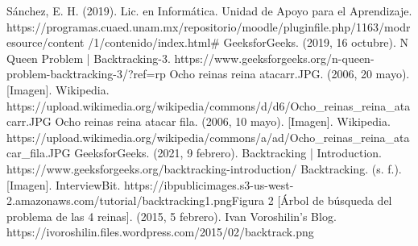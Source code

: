 \documentclass{article}
\begin{document}
\begin{thebibliography}{}
    Sánchez, E. H. (2019). Lic. en Informática. Unidad de Apoyo para el Aprendizaje. https://programas.cuaed.unam.mx/repositorio/moodle/pluginfile.php/1163/modresource/content
    /1/contenido/index.html#
    GeeksforGeeks. (2019, 16 octubre). N Queen Problem | Backtracking-3. https://www.geeksforgeeks.org/n-queen-problem-backtracking-3/?ref=rp
    Ocho reinas reina atacarr.JPG. (2006, 20 mayo). [Imagen]. Wikipedia. https://upload.wikimedia.org/wikipedia/commons/d/d6/Ocho\_reinas\_reina\_atacarr.JPG
    Ocho reinas reina atacar fila. (2006, 10 mayo). [Imagen]. Wikipedia. https://upload.wikimedia.org/wikipedia/commons/a/ad/Ocho\_reinas\_reina\_atacar\_fila.JPG
    GeeksforGeeks. (2021, 9 febrero). Backtracking | Introduction. https://www.geeksforgeeks.org/backtracking-introduction/
    Backtracking. (s. f.). [Imagen]. InterviewBit. https://ibpublicimages.s3-us-west-2.amazonaws.com/tutorial/backtracking1.pngFigura 2
    [Árbol de búsqueda del problema de las 4 reinas]. (2015, 5 febrero). Ivan Voroshilin’s Blog. https://ivoroshilin.files.wordpress.com/2015/02/backtrack.png
\end{thebibliography}
\end{document}

